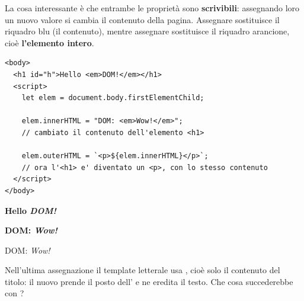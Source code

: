 La cosa interessante è che entrambe le proprietà sono \textbf{scrivibili}:
assegnando loro un nuovo valore si cambia il contenuto della pagina.
Assegnare  sostituisce il riquadro blu (il contenuto), mentre
assegnare  sostituisce il riquadro arancione, cioè
\textbf{l'elemento intero}.

\begin{affianco}[0.58][c]
\begin{lstlisting}[style=html, name=innerhtml-scrittura.html]
<body>
  <h1 id="h">Hello <em>DOM!</em></h1>
  <script>
    let elem = document.body.firstElementChild;

    elem.innerHTML = "DOM: <em>Wow!</em>";
    // cambiato il contenuto dell'elemento <h1>

    elem.outerHTML = `<p>${elem.innerHTML}</p>`;
    // ora l'<h1> e' diventato un <p>, con lo stesso contenuto
  </script>
</body>
\end{lstlisting}
\risultato
\begin{browser}
  {\Lora\bfseries\Huge Hello \textit{DOM!}}
\end{browser}
\begin{browser}
  {\Lora\bfseries\Huge DOM: \textit{Wow!}}
\end{browser}
\begin{browser}
  DOM: \textit{Wow!}
\end{browser}
\end{affianco}

Nell'ultima assegnazione il template letterale usa , cioè
solo il contenuto del titolo: il nuovo  prende il posto dell' e ne
eredita il testo. Che cosa succederebbe con ?

